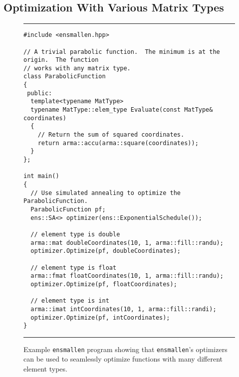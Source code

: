 \subsection{Optimization With Various Matrix Types}
\label{sec:templated_optimize}


\begin{figure}[t!]
\hrule
\vspace{1ex}
\begin{verbatim}
#include <ensmallen.hpp>

// A trivial parabolic function.  The minimum is at the origin.  The function
// works with any matrix type.
class ParabolicFunction
{
 public:
  template<typename MatType>
  typename MatType::elem_type Evaluate(const MatType& coordinates)
  {
    // Return the sum of squared coordinates.
    return arma::accu(arma::square(coordinates));
  }
};

int main()
{
  // Use simulated annealing to optimize the ParabolicFunction.
  ParabolicFunction pf;
  ens::SA<> optimizer(ens::ExponentialSchedule());

  // element type is double
  arma::mat doubleCoordinates(10, 1, arma::fill::randu);
  optimizer.Optimize(pf, doubleCoordinates);

  // element type is float
  arma::fmat floatCoordinates(10, 1, arma::fill::randu);
  optimizer.Optimize(pf, floatCoordinates);

  // element type is int
  arma::imat intCoordinates(10, 1, arma::fill::randi);
  optimizer.Optimize(pf, intCoordinates);
}
\end{verbatim}
\hrule
\vspace*{-0.5em}
\caption{Example {\tt ensmallen} program showing that {\tt ensmallen}'s
optimizers can be used to seamlessly optimize functions with many different
element types.}
\label{fig:many_optimize}
\end{figure}

